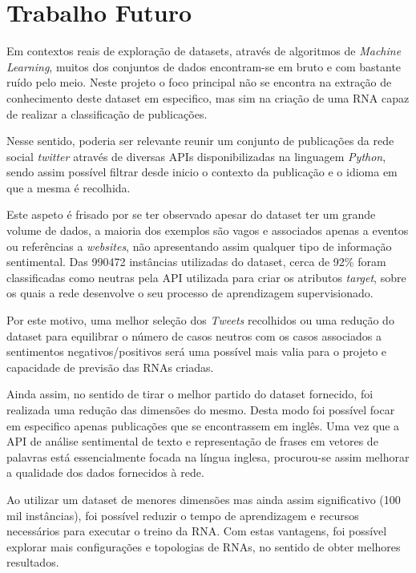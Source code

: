 \chapter{Trabalho Futuro}

Em contextos reais de exploração de datasets, através de algoritmos de \textit{Machine Learning}, muitos dos conjuntos de dados encontram-se em bruto e com bastante ruído pelo meio. Neste projeto o foco principal não se encontra na extração de conhecimento deste dataset em especifico, mas sim na criação de uma RNA capaz de realizar a classificação de publicações. 

Nesse sentido, poderia ser relevante reunir um conjunto de publicações da rede social \textit{twitter} através de diversas APIs disponibilizadas na linguagem \textit{Python}, sendo assim possível filtrar desde inicio o contexto da publicação e o idioma em que a mesma é recolhida. 

Este aspeto é frisado por se ter observado apesar do dataset ter um grande volume de dados, a maioria dos exemplos são vagos e associados apenas a eventos ou referências a \textit{websites}, não apresentando assim qualquer tipo de informação sentimental. 
Das 990472 instâncias utilizadas do dataset, cerca de 92\% foram classificadas como neutras pela API utilizada para criar os atributos \textit{target}, sobre os quais a rede desenvolve o seu processo de aprendizagem supervisionado. 

Por este motivo, uma melhor seleção dos \textit{Tweets} recolhidos ou uma redução do dataset para equilibrar o número de casos neutros com os casos associados a sentimentos negativos/positivos será uma possível mais valia para o projeto e capacidade de previsão das RNAs criadas. 

Ainda assim, no sentido de tirar o melhor partido do dataset fornecido, foi realizada uma redução das dimensões do mesmo. Desta modo foi possível focar em especifico apenas publicações que se encontrassem em inglês. 
Uma vez que a API de análise sentimental de texto e representação de frases em vetores de palavras está essencialmente focada na língua inglesa, procurou-se assim melhorar a qualidade dos dados fornecidos à rede. 

Ao utilizar um dataset de menores dimensões mas ainda assim significativo (100 mil instâncias), foi possível reduzir o tempo de aprendizagem e recursos necessários para executar o treino da RNA. Com estas vantagens, foi possível explorar mais configurações e topologias de RNAs, no sentido de obter melhores resultados. 


